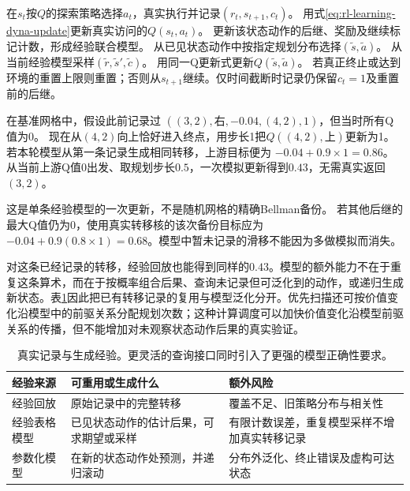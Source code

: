 \begin{algorithm}[随机表格Dyna的一轮交互]
  \label{alg:rl-learning-dyna}
  \begin{algorithmic}[1]
    \State 在$s_t$按$Q$的探索策略选择$a_t$，真实执行并记录$(r_t,s_{t+1},c_t)$。
    \State 用式\eqref{eq:rl-learning-dyna-update}更新真实访问的$Q(s_t,a_t)$。
    \State 更新该状态动作的后继、奖励及继续标记计数，形成经验联合模型。
      \State 从已见状态动作中按指定规划分布选择$(\widetilde s,\widetilde a)$。
      \State 从当前经验模型采样$(\widetilde r,\widetilde s',\widetilde c)$。
      \State 用同一Q更新式更新$Q(\widetilde s,\widetilde a)$。
    \EndFor
    \State 若真正终止或达到环境的重置上限则重置；否则从$s_{t+1}$继续。仅时间截断时记录仍保留$c_t=1$及重置前的后继。
  \end{algorithmic}
\end{algorithm}

\begin{example}[不返回上游也能传播一次奖励]
  \label{ex:rl-learning-dyna-grid}
  在基准网格中，假设此前记录过
  $((3,2),\text{右},-0.04,(4,2),1)$，但当时所有Q值为0。
  现在从$(4,2)$向上恰好进入终点，用步长1把$Q((4,2),\text{上})$更新为1。
  若本轮模型从第一条记录生成相同转移，上游目标便为
  $-0.04+0.9\times1=0.86$。从当前上游Q值0出发、取规划步长$0.5$，一次模拟更新得到$0.43$，无需真实返回$(3,2)$。

  这是单条经验模型的一次更新，不是随机网格的精确Bellman备份。
  若其他后继的最大Q值仍为0，使用真实转移核的该次备份目标应为
  $-0.04+0.9(0.8\times1)=0.68$。模型中暂未记录的滑移不能因为多做模拟而消失。
\end{example}

对这条已经记录的转移，经验回放也能得到同样的$0.43$。模型的额外能力不在于重复这条算术，而在于按概率组合后果、查询未记录但可泛化到的动作，或递归生成新状态。表\ref{tab:rl-learning-generated-experience}因此把已有转移记录的复用与模型泛化分开。优先扫描还可按价值变化沿模型中的前驱关系分配规划次数；这种计算调度可以加快价值变化沿模型前驱关系的传播，但不能增加对未观察状态动作后果的真实验证。

\begin{table}[htbp]
  \centering
  \small
  \begin{tabularx}{\linewidth}{>{\raggedright\arraybackslash}p{21mm} >{\raggedright\arraybackslash}X >{\raggedright\arraybackslash}X}
    \toprule
    经验来源 & 可重用或生成什么 & 额外风险 \\
    \midrule
    经验回放 & 原始记录中的完整转移 & 覆盖不足、旧策略分布与相关性 \\
    经验表格模型 & 已见状态动作的估计后果，可求期望或采样 & 有限计数误差，重复模型采样不增加真实转移记录 \\
    参数化模型 & 在新的状态动作处预测，并递归滚动 & 分布外泛化、终止错误及虚构可达状态 \\
    \bottomrule
  \end{tabularx}
  \caption{真实记录与生成经验。更灵活的查询接口同时引入了更强的模型正确性要求。}
  \label{tab:rl-learning-generated-experience}
\end{table}

